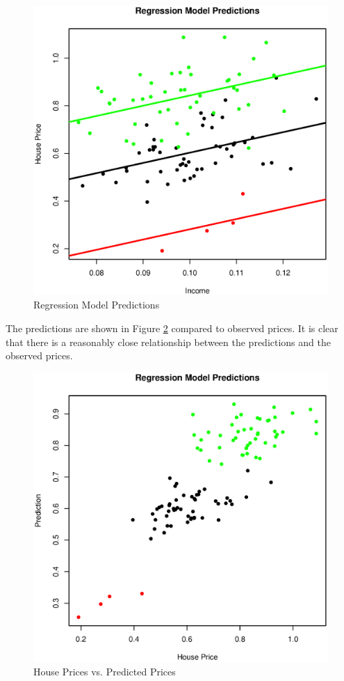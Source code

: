 \documentclass{paper}
\begin{document}
\begin{figure}
\centering
\includegraphics[width=\textwidth]{../Figures/regression.eps}
\caption{Regression Model Predictions}
\label{fig:reg}
\end{figure}


\pagebreak
The predictions are shown in Figure \ref{fig:pred} compared to observed prices.
It is clear that there is a reasonably close relationship between the predictions and the observed prices.

\begin{figure}
\centering
\includegraphics[width=\textwidth]{../Figures/predictions.eps}
\caption{House Prices vs. Predicted Prices}
\label{fig:pred}
\end{figure}




\end{document}
